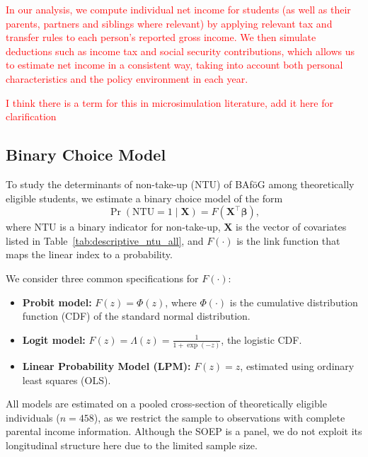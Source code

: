 \textcolor{red}{In our analysis, we compute individual net income for students (as well as their parents, partners and siblings where relevant) by applying relevant tax and transfer rules to each person’s reported gross income. We then simulate deductions such as income tax and social security contributions, which allows us to estimate net income in a consistent way, taking into account both personal characteristics and the policy environment in each year.}

\textcolor{red}{I think there is a term for this in microsimulation literature, add it here for clarification}


%
%
\subsection{Binary Choice Model}

To study the determinants of non-take-up (NTU) of BAföG among theoretically eligible students, we estimate a binary choice model of the form
\begin{equation}
  \Pr(\mathrm{NTU} = 1 \mid \mathbf{X}) = F(\mathbf{X}^\top \boldsymbol{\beta}),
\end{equation}
where \( \mathrm{NTU} \) is a binary indicator for non-take-up, \( \mathbf{X} \) is the vector of covariates listed in Table~\ref{tab:descriptive_ntu_all}, and \( F(\cdot) \) is the link function that maps the linear index to a probability.

We consider three common specifications for \( F(\cdot) \):

\begin{itemize}
  \item \textbf{Probit model:} \( F(z) = \Phi(z) \), where \( \Phi(\cdot) \) is the cumulative distribution function (CDF) of the standard normal distribution.
  \item \textbf{Logit model:} \( F(z) = \Lambda(z) = \frac{1}{1 + \exp(-z)} \), the logistic CDF.
  \item \textbf{Linear Probability Model (LPM):} \( F(z) = z \), estimated using ordinary least squares (OLS).
\end{itemize}

All models are estimated on a pooled cross-section of theoretically eligible individuals (\( n = 458 \)), as we restrict the sample to observations with complete parental income information. Although the SOEP is a panel, we do not exploit its longitudinal structure here due to the limited sample size.

